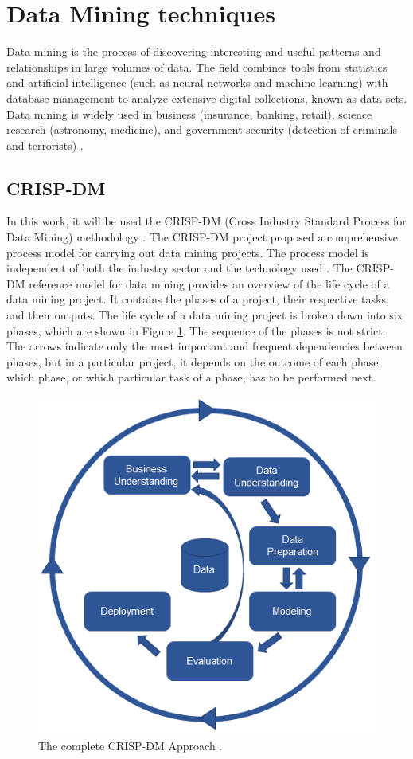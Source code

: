 \section{Data Mining techniques}

Data mining is the process of discovering interesting and useful patterns and relationships in large volumes of data. The field combines tools from statistics and artificial intelligence (such as neural networks and machine learning) with database management to analyze extensive digital collections, known as data sets. Data mining is widely used in business (insurance, banking, retail), science research (astronomy, medicine), and government security (detection of criminals and terrorists) \cite{Okonkwo2011COMBATINGCA}. 

\subsection{CRISP-DM}
\label{sub:crisp_dm}

In this work, it will be used the CRISP-DM (Cross Industry Standard Process for Data Mining) methodology \cite{CRISPDM}.
The CRISP-DM project proposed a comprehensive process model for carrying out data mining projects. The process model is independent of both the industry sector and the technology used \cite{CRISPDM}. 
The CRISP-DM reference model for data mining provides an overview of the life cycle of a data
mining project. It contains the phases of a project, their respective tasks, and their outputs.
The life cycle of a data mining project is broken down into six phases, which are shown in Figure \ref{fig:crisp_dm}.
The sequence of the phases is not strict. The arrows indicate only the most important and frequent
dependencies between phases, but in a particular project, it depends on the outcome of each phase,
which phase, or which particular task of a phase, has to be performed next.

\begin{figure}[H]
\centering
\includegraphics[width=0.8\linewidth]{Chapters/img/crisp_dm.png}
\caption{The complete CRISP-DM Approach  \cite{WEBSITE:CRISPDM}.  }
\label{fig:crisp_dm}
\end{figure}

